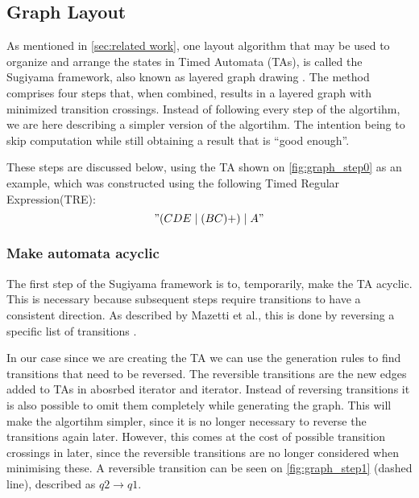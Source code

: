 \subsection{Graph Layout}\label{subsec:graphlayout}





As mentioned in \cref{sec:related work}, one layout algorithm that may be used to organize and arrange the states in Timed Automata (TAs), is called the Sugiyama framework, also known as layered graph drawing \cite{Sugiyama1981}. The method comprises four steps that, when combined, results in a layered graph with minimized transition crossings. Instead of following every step of the algortihm, we are here describing a simpler version of the algortihm. The intention being to skip computation while still obtaining a result that is ``good enough''.

These steps are discussed below, using the TA shown on \cref{fig:graph_step0} as an example, which was constructed using the following Timed Regular Expression(TRE): $$"(CDE\mid(BC)+)\mid A"$$

\begin{center}
    
\end{center}

\subsubsection{Make automata acyclic}
The first step of the Sugiyama framework is to, temporarily, make the TA acyclic. This is necessary because subsequent steps require transitions to have a consistent direction. As described by Mazetti et al., this is done by reversing a specific list of transitions \cite{Mazetti2012}.

In our case since we are creating the TA we can use the generation rules to find transitions that need to be reversed.
The reversible transitions are the new edges added to TAs in abosrbed iterator and iterator.
Instead of reversing transitions it is also possible to omit them completely while generating the graph. This will make the algortihm simpler, since it is no longer necessary to reverse the transitions again later. However, this comes at the cost of possible transition crossings in later, since the reversible transitions are no longer considered when minimising these. A reversible transition can be seen on \cref{fig:graph_step1} (dashed line), described as $q2\rightarrow q1$.

